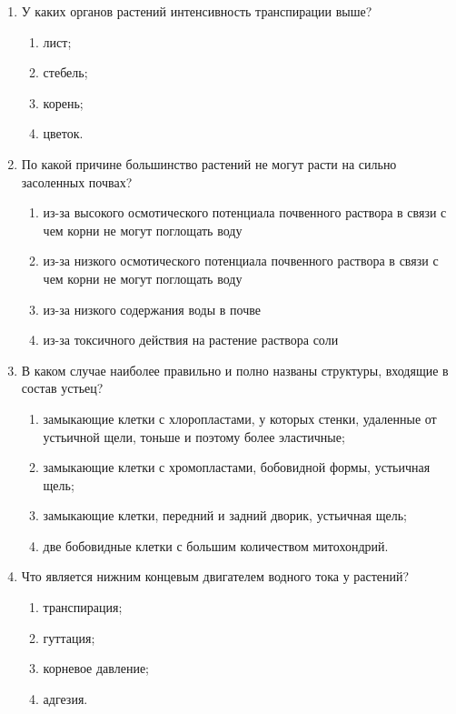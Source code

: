 \begin{enumerate}
\item У каких органов растений интенсивность транспирации выше?
\begin{enumerate}
	\item лист; 
	\item стебель; 
	\item корень; 
	\item цветок.
\end{enumerate}


\item По какой причине большинство растений не могут расти на сильно засоленных почвах?
\begin{enumerate}
	\item из-за высокого осмотического потенциала почвенного раствора в связи с чем корни не могут поглощать воду
	\item из-за низкого осмотического потенциала почвенного раствора в связи с чем корни не могут поглощать воду
	\item из-за низкого содержания воды в почве
	\item из-за токсичного действия на растение раствора соли
\end{enumerate}

\item В каком случае наиболее правильно и полно названы структуры, входящие в состав устьец?  
\begin{enumerate}
	\item замыкающие клетки с хлоропластами, у которых стенки, удаленные от устьичной щели, тоньше и поэтому более эластичные; 
	\item замыкающие клетки с хромопластами, бобовидной формы, устьичная щель;  
	\item замыкающие клетки, передний и задний дворик, устьичная щель; 
	\item две бобовидные клетки с большим количеством митохондрий.   
\end{enumerate}

\item Что является нижним концевым двигателем водного тока у растений?
\begin{enumerate}
	\item транспирация; 
	\item гуттация; 
	\item корневое давление; 
	\item адгезия.
\end{enumerate}


\end{enumerate}
